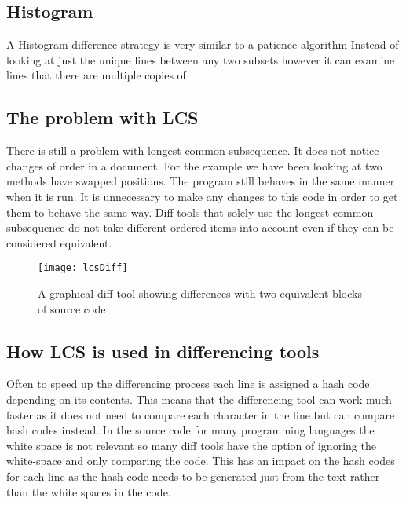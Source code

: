\subsection{Histogram}
A Histogram difference strategy is very similar to a patience algorithm
Instead of looking at just the unique lines between any two subsets however it can examine lines that there are multiple copies of 

\subsection{The problem with LCS}
There is still a problem with longest common subsequence. It does not notice changes of order in a document.  For the example we have been looking at two methods have swapped positions.  The program still behaves in the same manner when it is run.  It is unnecessary to make any changes to this code in order to get them to behave the same way. Diff tools that solely use the longest common subsequence do not take different ordered items into account even if they can be considered equivalent.

\begin{figure}[h]
\begin{center}
\texttt{[image: lcsDiff]}
\end{center}
 \caption{A graphical diff tool showing differences with two equivalent blocks of source code}
\end{figure}

\subsection{How LCS is used in differencing tools}
Often to speed up the differencing process each line is assigned a hash code depending on its contents. 
This means that the differencing tool can work much faster as it does not need to compare each character in the line but can compare hash codes instead.
In the source code for many programming languages the white space is not relevant so many diff tools have the option of ignoring the white-space and only comparing the code.
This has an impact on the hash codes for each line as the hash code needs to be generated just from the text rather than the white spaces in the code.
% 
 
